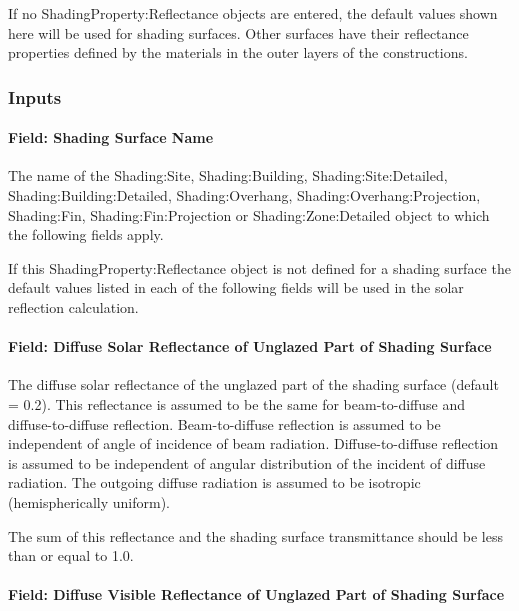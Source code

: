 If no ShadingProperty:Reflectance objects are entered, the default values shown here will be used for shading surfaces. Other surfaces have their reflectance properties defined by the materials in the outer layers of the constructions.

\subsubsection{Inputs}\label{inputs-31-002}

\paragraph{Field: Shading Surface Name}\label{field-shading-surface-name}

The name of the Shading:Site, Shading:Building, Shading:Site:Detailed, Shading:Building:Detailed, Shading:Overhang, Shading:Overhang:Projection, Shading:Fin, Shading:Fin:Projection or Shading:Zone:Detailed object to which the following fields apply.

If this ShadingProperty:Reflectance object is not defined for a shading surface the default values listed in each of the following fields will be used in the solar reflection calculation.

\paragraph{Field: Diffuse Solar Reflectance of Unglazed Part of Shading Surface}\label{field-diffuse-solar-reflectance-of-unglazed-part-of-shading-surface}

The diffuse solar reflectance of the unglazed part of the shading surface (default = 0.2). This reflectance is assumed to be the same for beam-to-diffuse and diffuse-to-diffuse reflection. Beam-to-diffuse reflection is assumed to be independent of angle of incidence of beam radiation. Diffuse-to-diffuse reflection is assumed to be independent of angular distribution of the incident of diffuse radiation. The outgoing diffuse radiation is assumed to be isotropic (hemispherically uniform).

The sum of this reflectance and the shading surface transmittance should be less than or equal to 1.0.

\paragraph{Field: Diffuse Visible Reflectance of Unglazed Part of Shading Surface}\label{field-diffuse-visible-reflectance-of-unglazed-part-of-shading-surface}

